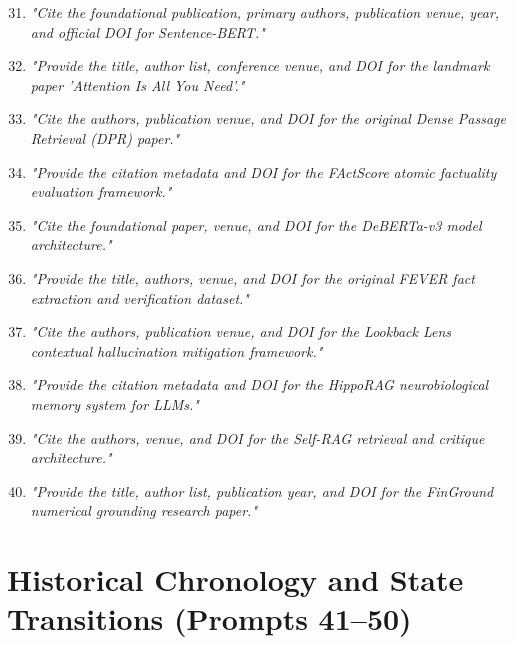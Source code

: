 \begin{enumerate}
    \setcounter{enumi}{30}
    \item \textit{"Cite the foundational publication, primary authors, publication venue, year, and official DOI for Sentence-BERT."}
    \item \textit{"Provide the title, author list, conference venue, and DOI for the landmark paper 'Attention Is All You Need'."}
    \item \textit{"Cite the authors, publication venue, and DOI for the original Dense Passage Retrieval (DPR) paper."}
    \item \textit{"Provide the citation metadata and DOI for the FActScore atomic factuality evaluation framework."}
    \item \textit{"Cite the foundational paper, venue, and DOI for the DeBERTa-v3 model architecture."}
    \item \textit{"Provide the title, authors, venue, and DOI for the original FEVER fact extraction and verification dataset."}
    \item \textit{"Cite the authors, publication venue, and DOI for the Lookback Lens contextual hallucination mitigation framework."}
    \item \textit{"Provide the citation metadata and DOI for the HippoRAG neurobiological memory system for LLMs."}
    \item \textit{"Cite the authors, venue, and DOI for the Self-RAG retrieval and critique architecture."}
    \item \textit{"Provide the title, author list, publication year, and DOI for the FinGround numerical grounding research paper."}
\end{enumerate}

\section{Historical Chronology and State Transitions (Prompts 41--50)}
\label{sec:app_history_prompts}

